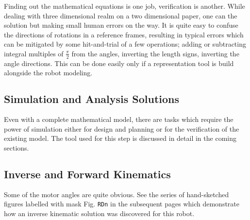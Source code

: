 {{        Finding out the mathematical equations is one job, verification is another. While dealing with three dimensional realm on a two dimensional paper, one can the solution but making small human errors on the way. It is quite easy to confuse the directions of rotations in a reference frames, resulting in typical errors which can be mitigated by some hit-and-trial of a few operations; adding or subtracting integral multiples of $\frac{\pi}{2}$ from the angles, inverting the length signs, inverting the angle directions. This can be done easily only if a representation tool is build alongside the robot modeling.
    }
    \subsection{Simulation and Analysis Solutions}
    {
        Even with a complete mathematical model, there are tasks which require the power of simulation either for design and planning or for the verification of the existing model. The tool used for this step is discussed in detail in the coming sections.
    }
}

    \subsection{Inverse and Forward Kinematics}
    Some of the motor angles are quite obvious. See the series of hand-sketched figures labelled with mask Fig. \texttt{RDn} in the subsequent pages which demonstrate how an inverse kinematic solution was discovered for this robot.

